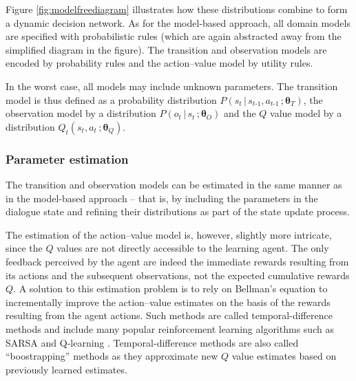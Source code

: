 Figure \ref{fig:modelfreediagram} illustrates how these distributions combine to form a dynamic decision network. As for the model-based approach, all domain models are specified with probabilistic rules (which are again abstracted away from the simplified diagram in the figure). The transition and observation models are encoded by probability rules and the action--value model by utility rules. 

In the worst case, all models may include unknown parameters.  The transition model is thus defined as a probability distribution $P(s_t \, | \, s_{t\mbox{-}1}, a_{t\mbox{-}1} \,; \boldsymbol\theta_T)$, the observation model by a distribution $P(o_t \, | \, s_t\,; \boldsymbol\theta_O)$ and the $Q$ value model by a distribution $Q_t(s_t,a_t\,; \boldsymbol\theta_Q)$.  

\subsubsection*{Parameter estimation}

The transition and observation models can be estimated in the same manner as in the model-based approach -- that is, by including the parameters in the dialogue state and refining their distributions as part of the state update process. 

The estimation of the action--value model is, however, slightly more intricate, since the $Q$ values are not directly accessible to the learning agent.  The only feedback perceived by the agent are indeed the immediate rewards resulting from its actions and the subsequent observations, not the expected cumulative rewards $Q$.  A solution to this estimation problem is to rely on Bellman's equation to incrementally improve the action--value estimates on the basis of the rewards resulting from the agent actions. Such methods are called temporal-difference methods and include many popular reinforcement learning algorithms such as SARSA and Q-learning \citep{citeulike:112017}. Temporal-difference methods are also called ``boostrapping'' methods as they approximate new $Q$ value estimates based on previously learned estimates.

